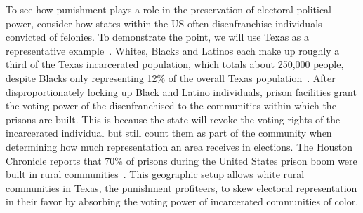 \documentclass{article}
\begin{document}
        To see how punishment plays a role in the preservation of electoral political power, consider how states within the US often disenfranchise individuals convicted of felonies. To demonstrate the point, we will use Texas as a representative example~\cite{daily-texan}. Whites, Blacks and Latinos each make up roughly a third of the Texas incarcerated population, which totals about 250,000 people, despite Blacks only representing 12\% of the overall Texas population~\cite{prison-policy-tx}. After disproportionately locking up Black and Latino individuals, prison facilities grant the voting power of the disenfranchised to the communities within which the prisons are built. This is because the state will revoke the voting rights of the incarcerated individual but still count them as part of the community when determining how much representation an area receives in elections. The Houston Chronicle reports that 70\% of prisons during the United States prison boom were built in rural communities~\cite{houston-chronicle}. This geographic setup allows white rural communities in Texas, the punishment profiteers, to skew electoral representation in their favor by absorbing the voting power of incarcerated communities of color. 
\end{document}
